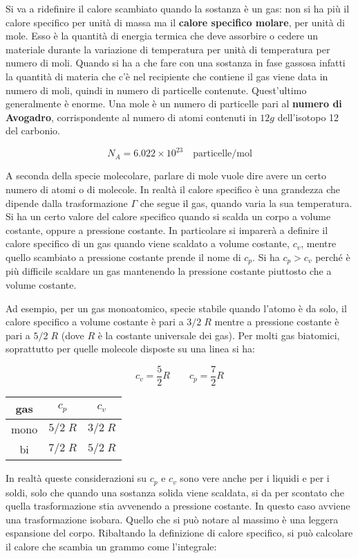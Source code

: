 Si va a ridefinire il calore scambiato quando la sostanza è un gas: non si ha più il calore specifico per unità di massa ma il \textbf{calore specifico molare}, per unità di mole. Esso è la quantità di energia termica che deve assorbire o cedere un materiale durante la variazione di temperatura per unità di temperatura per numero di moli. Quando si ha a che fare con una sostanza in fase gassosa infatti la quantità di materia che c'è nel recipiente che contiene il gas viene data in numero di moli, quindi in numero di particelle contenute. Quest'ultimo generalmente è enorme. Una mole è un numero di particelle pari al \textbf{numero di Avogadro}, corrispondente al numero di atomi contenuti in $12 g$ dell'isotopo 12 del carbonio.

\[
	N_A = 6.022 \times 10^{23} \quad \text{particelle/mol}
\]

A seconda della specie molecolare, parlare di mole vuole dire avere un certo numero di atomi o di molecole.
In realtà il calore specifico è una grandezza che dipende dalla trasformazione $\Gamma$ che segue il gas, quando varia la sua temperatura. Si ha un certo valore del calore specifico quando si scalda un corpo a volume costante, oppure a pressione costante. In particolare si imparerà a definire il calore specifico di un gas quando viene scaldato a volume costante, $c_v$, mentre quello scambiato a pressione costante prende il nome di $c_p$. Si ha $c_p > c_v$ perché è più difficile scaldare un gas mantenendo la pressione costante piuttosto che a volume costante.

Ad esempio, per un gas monoatomico, specie stabile quando l'atomo è da solo, il calore specifico a volume costante è pari a $3/2\;R$ mentre a pressione costante è pari a $5/2\;R$ (dove $R$ è la costante universale dei gas). Per molti gas biatomici, soprattutto per quelle molecole disposte su una linea si ha:

\[
	c_v = \frac{5}{2}R \qquad c_p = \frac{7}{2}R
\]

\begin{table}[htpb]
	\centering
	\begin{tabular}{|c|c|c|}
		\hline
		gas & $c_p$ & $c_v$ \\
		\hline
		mono & $5/2 \;R$ & $3/2 \;R$ \\
		\hline
		bi & $7/2 \;R$ & $5/2 \;R$ \\
		\hline
	\end{tabular}
\end{table}

In realtà queste considerazioni su $c_p$ e $c_v$ sono vere anche per i liquidi e per i soldi, solo che quando una sostanza solida viene scaldata, si da per scontato che quella trasformazione stia avvenendo a pressione costante. In questo caso avviene una trasformazione isobara. Quello che si può notare al massimo è una leggera espansione del corpo. Ribaltando la definizione di calore specifico, si può calcolare il calore che scambia un grammo come l'integrale:

